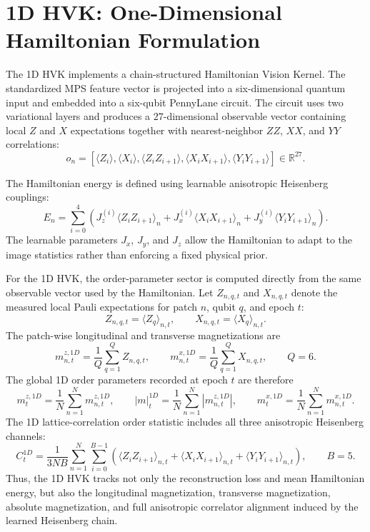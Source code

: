 \documentclass[11pt]{article}
\begin{document}
\section{1D HVK: One-Dimensional Hamiltonian Formulation}

The 1D HVK implements a chain-structured Hamiltonian Vision Kernel. The standardized MPS feature vector is projected into a six-dimensional quantum input and embedded into a six-qubit PennyLane circuit. The circuit uses two variational layers and produces a $27$-dimensional observable vector containing local $Z$ and $X$ expectations together with nearest-neighbor $ZZ$, $XX$, and $YY$ correlations:
\begin{equation}
o_n =
\left[
\langle Z_i\rangle,
\langle X_i\rangle,
\langle Z_iZ_{i+1}\rangle,
\langle X_iX_{i+1}\rangle,
\langle Y_iY_{i+1}\rangle
\right]
\in \mathbb{R}^{27}.
\end{equation}

The Hamiltonian energy is defined using learnable anisotropic Heisenberg couplings:
\begin{equation}
E_n =
\sum_{i=0}^{4}
\left(
J_z^{(i)}\langle Z_iZ_{i+1}\rangle_n
+ J_x^{(i)}\langle X_iX_{i+1}\rangle_n
+ J_y^{(i)}\langle Y_iY_{i+1}\rangle_n
\right).
\end{equation}
The learnable parameters $J_x$, $J_y$, and $J_z$ allow the Hamiltonian to adapt to the image statistics rather than enforcing a fixed physical prior.

For the 1D HVK, the order-parameter sector is computed directly from the same observable vector used by the Hamiltonian. Let $Z_{n,q,t}$ and $X_{n,q,t}$ denote the measured local Pauli expectations for patch $n$, qubit $q$, and epoch $t$:
\begin{equation}
Z_{n,q,t}=\langle Z_q\rangle_{n,t},
\qquad
X_{n,q,t}=\langle X_q\rangle_{n,t}.
\end{equation}
The patch-wise longitudinal and transverse magnetizations are
\begin{equation}
m_{n,t}^{z,1D}
=
\frac{1}{Q}
\sum_{q=1}^{Q} Z_{n,q,t},
\qquad
m_{n,t}^{x,1D}
=
\frac{1}{Q}
\sum_{q=1}^{Q} X_{n,q,t},
\qquad Q=6.
\end{equation}
The global 1D order parameters recorded at epoch $t$ are therefore
\begin{equation}
m_t^{z,1D}
=
\frac{1}{N}\sum_{n=1}^{N}m_{n,t}^{z,1D},
\qquad
|m|_t^{1D}
=
\frac{1}{N}\sum_{n=1}^{N}\left|m_{n,t}^{z,1D}\right|,
\qquad
m_t^{x,1D}
=
\frac{1}{N}\sum_{n=1}^{N}m_{n,t}^{x,1D}.
\end{equation}
The 1D lattice-correlation order statistic includes all three anisotropic Heisenberg channels:
\begin{equation}
C_t^{1D}
=
\frac{1}{3NB}
\sum_{n=1}^{N}
\sum_{i=0}^{B-1}
\left(
\langle Z_iZ_{i+1}\rangle_{n,t}
+\langle X_iX_{i+1}\rangle_{n,t}
+\langle Y_iY_{i+1}\rangle_{n,t}
\right),
\qquad B=5.
\end{equation}
Thus, the 1D HVK tracks not only the reconstruction loss and mean Hamiltonian energy, but also the longitudinal magnetization, transverse magnetization, absolute magnetization, and full anisotropic correlator alignment induced by the learned Heisenberg chain.
\end{document}
